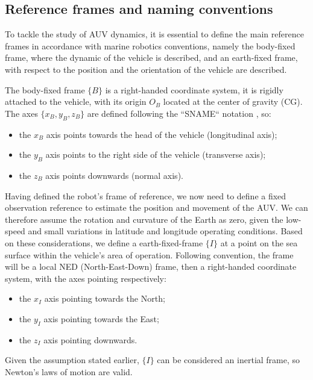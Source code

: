 \subsection{Reference frames and naming conventions}
To tackle the study of AUV dynamics, it is essential to define the main reference frames in accordance with marine robotics conventions, namely 
the body-fixed frame, where the dynamic of the vehicle is described, and an earth-fixed frame, with respect to the position and the orientation 
of the vehicle are described.

The body-fixed frame $\{B\}$ is a right-handed coordinate system, it is rigidly attached to the vehicle, with its origin $O_B$ located at the 
center of gravity (CG). The axes $\{x_B , y_B , z_B\}$ are defined following the ``SNAME`` notation
 \cite{thesocietyofnavalarchitectsandmarineengineerssnameNomenclatureTreatingMotion1950}, so:
 \begin{itemize}
    \item the $x_B$ axis points towards the head of the vehicle (longitudinal axis);
    \item the $y_B$ axis points to the right side of the vehicle (transverse axis);
    \item the $z_B$ axis points downwards (normal axis).
 \end{itemize}

Having defined the robot's frame of reference, we now need to define a fixed observation reference to estimate the position and movement of the AUV. 
We can therefore assume the rotation and curvature of the Earth as zero, given the low-speed and small variations in latitude and longitude operating conditions. 
Based on these considerations, we define a earth-fixed-frame $\{I\}$ at a point on the sea surface within the vehicle's area of operation. Following convention, 
the frame will be a local NED (North-East-Down) frame, then a right-handed coordinate system, with the axes pointing respectively:
\begin{itemize}
    \item the $x_I$ axis pointing towards the North;
    \item the $y_I$ axis pointing towards the East;
    \item the $z_I$ axis pointing downwards.
\end{itemize}
Given the assumption stated earlier, $\{I\}$ can be considered an inertial frame, so Newton's laws of motion are valid.

